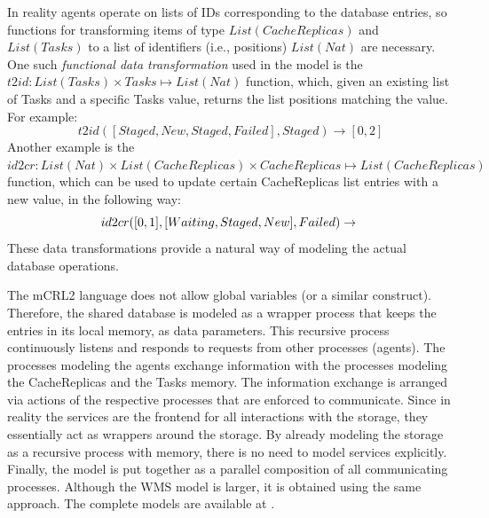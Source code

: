 \documentclass[10pt,conference]{IEEEtran}
\begin{document}
In reality agents operate on lists of IDs corresponding to the database
entries, so functions for transforming items of type \begin{math}List(CacheReplicas)\end{math}
and \begin{math}List(Tasks)\end{math}
to a list of identifiers (i.e., positions) 
\begin{math}List(Nat)\end{math} are necessary.
One such \textit{functional data transformation} used in the model is the 
$t2id:List(Tasks)\times Tasks\mapsto List(Nat)$ function, which,
given an existing list of Tasks and a specific Tasks value, returns the list positions
 matching the value.
For example:
\begin{displaymath}
t2id([Staged,New,Staged,Failed],Staged)\rightarrow [0,2] 
\end{displaymath}
Another example is the 
$id2cr:List(Nat)\times List(CacheReplicas)\times CacheReplicas\mapsto List(CacheReplicas)$                                                                                                
function, which can be used to update certain CacheReplicas list entries with a new value, in the following way:
\begin{displaymath}
id2cr([0,1],[Waiting,Staged,New],Failed) \\
 \rightarrow \\
\end{displaymath}
\begin{displaymath}
[Failed,Failed,New]
\end{displaymath}
These data transformations provide a natural way of modeling
the actual database operations.

The mCRL2 language does not allow global variables (or a similar construct).
Therefore, the shared database is modeled as a wrapper process
that keeps the entries in its local memory, as data parameters. This
recursive process continuously listens and responds
to requests from other processes (agents). 
The processes modeling the agents exchange information
with the processes modeling the CacheReplicas and the Tasks memory. The
information exchange is arranged via actions of the respective processes that
are enforced to communicate.
Since in reality the services are the frontend for all interactions with the storage,
they essentially act as wrappers around the storage. By already modeling
the storage as a recursive process with memory, there is no need to model services explicitly. 
Finally, the model is put together as a parallel composition of all
communicating processes. Although the WMS model is larger, it is obtained using the same approach.
The complete models are available at \cite{svn_mcrl2}.
\end{document}

